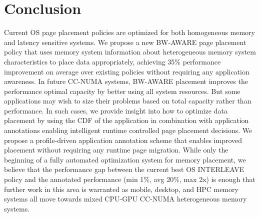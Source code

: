 \section{Conclusion}
Current OS page placement policies are optimized for both homogeneous memory and
latency sensitive systems.  We propose a new BW-AWARE page placement policy that
uses memory system information about heterogeneous memory system characteristics
to place data appropriately, achieving 35\% performance improvement on average
over existing policies without requiring any application awareness.  In future
CC-NUMA systems, BW-AWARE placement improves the performance optimal capacity by
better using all system resources. But some applications may wish to size their
problems based on total capacity rather than performance. In such cases, we
provide insight into how to optimize data placement by using the CDF of the
application in combination with application annotations enabling intelligent
runtime controlled page placement decisions.  We propose a profile-driven
application annotation scheme that enables improved placement without requiring
any runtime page migration. While only the beginning of a fully automated
optimization system for memory placement, we believe that the performance gap
between the current best OS INTERLEAVE policy and the annotated performance (min
1\%, avg 20\%, max 2x) is enough that further work in this area is warranted as
mobile, desktop, and HPC memory systems all move towards mixed CPU-GPU CC-NUMA
heterogeneous memory systems.

